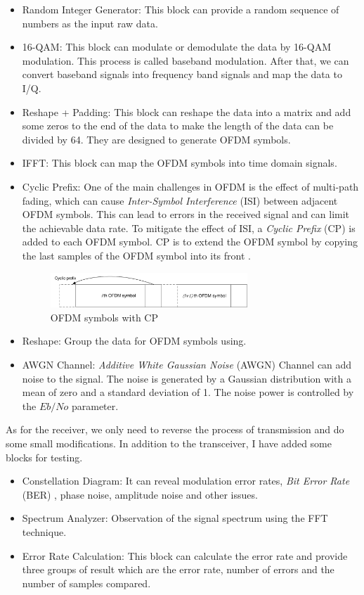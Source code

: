 \documentclass[10pt]{article}
\numberwithin{figure}{section}
\numberwithin{equation}{section}
\begin{document}
\begin{itemize}
    \item Random Integer Generator: This block can provide a random sequence of numbers as the input raw data.
    \item 16-QAM: This block can modulate or demodulate the data by 16-QAM modulation. This process is called baseband modulation. After that, we can convert baseband signals into frequency band signals and map the data to I/Q.
    \item Reshape + Padding: This block can reshape the data into a matrix and add some zeros to the end of the data to make the length of the data can be divided by 64. They are designed to generate OFDM symbols.
    \item IFFT: This block can map the OFDM symbols into time domain signals. 
    \item Cyclic Prefix: One of the main challenges in OFDM is the effect of multi-path fading, which can cause \textit{Inter-Symbol Interference} (ISI) between adjacent OFDM symbols. This can lead to errors in the received signal and can limit the achievable data rate. To mitigate the effect of ISI, a \textit{Cyclic Prefix} (CP) is added to each OFDM symbol. CP is to extend the OFDM symbol by copying the last samples of the OFDM symbol into its front \cite{RN146}.
    \begin{figure}[!ht]
        \centering
        \includegraphics[width=0.7\textwidth]{images/Cyclic prefix.pdf}
        \caption{OFDM symbols with CP}
        \label{fig:CP}
    \end{figure}
    \item Reshape: Group the data for OFDM symbols using.
    \item AWGN Channel: \textit{Additive White Gaussian Noise} (AWGN) Channel can add noise to the signal. The noise is generated by a Gaussian distribution with a mean of zero and a standard deviation of 1. The noise power is controlled by the $Eb/No$ parameter.
\end{itemize}
As for the receiver, we only need to reverse the process of transmission and do some small modifications. In addition to the transceiver, I have added some blocks for testing.
\begin{itemize}
    \item Constellation Diagram: It can reveal modulation error rates, \textit{Bit Error Rate} (BER) , phase noise, amplitude noise and other issues.
    \item Spectrum Analyzer: Observation of the signal spectrum using the FFT technique.
    \item Error Rate Calculation: This block can calculate the error rate and provide three groups of result which are the error rate, number of errors and the number of samples compared.
\end{itemize}
\end{document}
